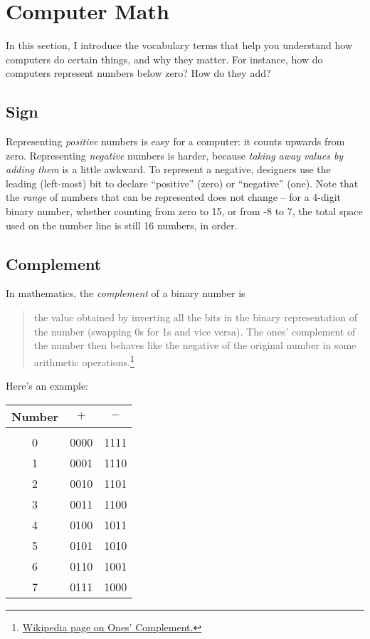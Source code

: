 \section{Computer Math}

In this section, I introduce the vocabulary terms that help you understand how computers do certain things, and why they matter. For instance, how do computers represent numbers below zero? How do they add?

\subsection*{Sign}

Representing \emph{positive} numbers is easy for a computer: it counts upwards from zero. Representing \emph{negative} numbers is harder, because \emph{taking away values by adding them} is a little awkward. To represent a negative, designers use the leading (left-most) bit to declare ``positive'' (zero) or ``negative'' (one). Note that the \emph{range} of numbers that can be represented does not change -- for a 4-digit binary number, whether counting from zero to 15, or from -8 to 7, the total space used on the number line is still 16 numbers, in order.


\subsection*{Complement}

In mathematics, the \emph{complement} of a binary number is 
\begin{quote}
the value obtained by inverting all the bits in the binary representation of the number (swapping 0s for 1s and vice versa). The ones' complement of the number then behaves like the negative of the original number in some arithmetic operations.\footnote{{\color{webblue}\href{https://en.wikipedia.org/wiki/Ones\%27_complement}{Wikipedia page on Ones' Complement.}}}
\end{quote}

Here's an example:

\bigskip

\begin{tabular} {c c c}
 Number &  $+$   &   $-$ \\[\sep]
 \hline\\[\negsep]
 0  &  0000 &  1111  \\ 
 1  & 0001  & 1110  \\
 2  & 0010  & 1101\\
 3  & 0011  & 1100\\
 4  & 0100  & 1011\\
 5  & 0101  & 1010\\
 6  & 0110  & 1001\\
 7  & 0111  & 1000\\
 \hline

\end{tabular}

